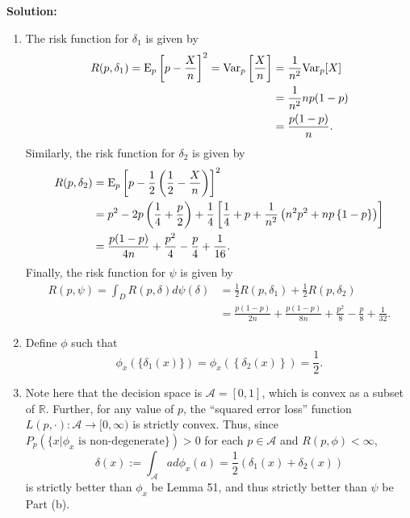 \documentclass[12pt]{article}
\begin{document}
\textbf{Solution:}

  \begin{enumerate}
    \item The risk function for $\delta_1$ is given by 
      \begin{align*}
        R(p,\delta_1)  = \mathrm{E}_p\left[ p - \frac{X}{n} \right]^{2} = \mathrm{Var}_p\left[ \frac{X}{n} \right] & = \frac{1}{n^2}\mathrm{Var}_p[X] \\
        & = \frac{1}{n^2}np(1-p) \\
        & = \frac{p(1-p)}{n}.
      \end{align*}
      Similarly, the risk function for $\delta_2$ is given by
      \begin{align*}
        R(p,\delta_2) & = \mathrm{E}_p\left[ p - \frac{1}{2}\left(\frac{1}{2} - \frac{X}{n}\right) \right]^2 \\
        & = p^2 - 2p\left( \frac{1}{4} + \frac{p}{2} \right) + \frac{1}{4}\left[ \frac{1}{4} + p + \frac{1}{n^2}\left( n^2p^2 + np\left\{ 1-p
        \right\} \right) \right] \\
        & = \frac{p(1-p)}{4n} + \frac{p^2}{4} - \frac{p}{4} + \frac{1}{16}.
      \end{align*}
      Finally, the risk function for $\psi$ is given by 
      \begin{align*}
        R(p,\psi) = \int_{D}R(p, \delta)d\psi(\delta) & = \frac{1}{2}R(p,\delta_1) + \frac{1}{2}R(p,\delta_2) \\
        & = \frac{p(1-p)}{2n} + \frac{p(1-p)}{8n} + \frac{p^2}{8} - \frac{p}{8} + \frac{1}{32}.
      \end{align*}
    \item Define $\phi$ such that 
      \[
        \phi_x\left( \{\delta_1(x)\} \right) = \phi_x\left( \left\{ \delta_2(x) \right\} \right) = \frac{1}{2}.
      \]
    \item Note here that the decision space is $\mathcal{A} = [0,1]$, which is convex as a subset of $\mathbb{R}$. Further, for any value of $p$, the
      ``squared error loss'' function $L(p,\cdot) : \mathcal{A} \rightarrow [0,\infty)$ is strictly convex. Thus, since $P_p(\{x | \phi_x \text{ is
      non-degenerate}\}) > 0$ for each $p \in \mathcal{A}$ and $R(p,\phi) < \infty$,
      \[
        \delta(x) := \int_{\mathcal{A}}ad\phi_x(a) = \frac{1}{2}\left( \delta_1(x) + \delta_2(x) \right)
      \]
      is strictly better than $\phi_x$ be Lemma 51, and thus strictly better than $\psi$ be Part (b).
  \end{enumerate}
\end{document}
